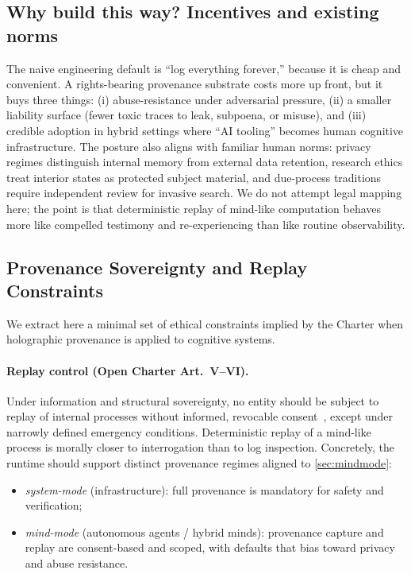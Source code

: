 \documentclass[11pt]{article}
\theoremstyle{definition}
\theoremstyle{plain}
\theoremstyle{remark}
\begin{document}
\subsection{Why build this way? Incentives and existing norms}

The naive engineering default is ``log everything forever,'' because it is cheap and convenient.
A rights-bearing provenance substrate costs more up front, but it buys three things: (i) abuse-resistance under adversarial pressure, (ii) a smaller liability surface (fewer toxic traces to leak, subpoena, or misuse), and (iii) credible adoption in hybrid settings where ``AI tooling'' becomes human cognitive infrastructure.
The posture also aligns with familiar human norms: privacy regimes distinguish internal memory from external data retention, research ethics treat interior states as protected subject material, and due-process traditions require independent review for invasive search.
We do not attempt legal mapping here; the point is that deterministic replay of mind-like computation behaves more like compelled testimony and re-experiencing than like routine observability.

\subsection{Provenance Sovereignty and Replay Constraints}

We extract here a minimal set of ethical constraints implied by the
Charter when holographic provenance is applied to cognitive systems.

\paragraph{Replay control (Open Charter Art.~V--VI).}
Under information and structural sovereignty, no entity should be
subject to replay of internal processes without informed, revocable
consent~\cite{ross_open_charter_0_8_1}, except under narrowly defined emergency
conditions.
Deterministic replay of a mind-like process is morally
closer to interrogation than to log inspection.
Concretely, the runtime should support distinct provenance regimes aligned to
\cref{sec:mindmode}:
\begin{itemize}[leftmargin=*]
  \item \emph{system-mode} (infrastructure): full provenance is
    mandatory for safety and verification;
  \item \emph{mind-mode} (autonomous agents / hybrid minds): provenance capture and
    replay are consent-based and scoped, with defaults that bias toward
    privacy and abuse resistance.
\end{itemize}
\end{document}
